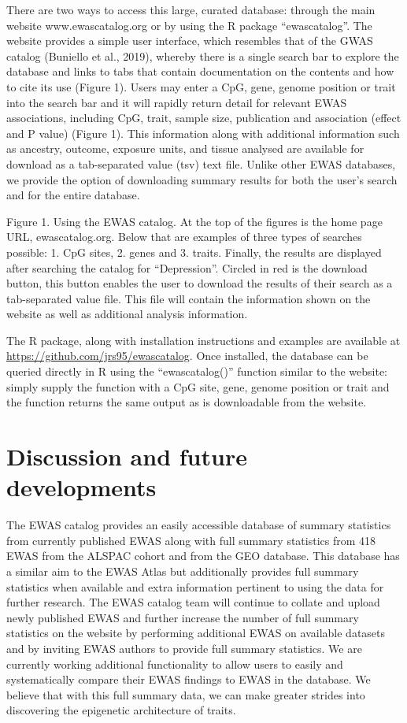 \documentclass[11pt,twoside]{bristolthesis}
\begin{document}
There are two ways to access this large, curated database: through the main website www.ewascatalog.org or by using the R package ``ewascatalog''. The website provides a simple user interface, which resembles that of the GWAS catalog (Buniello et al., 2019), whereby there is a single search bar to explore the database and links to tabs that contain documentation on the contents and how to cite its use (Figure 1). Users may enter a CpG, gene, genome position or trait into the search bar and it will rapidly return detail for relevant EWAS associations, including CpG, trait, sample size, publication and association (effect and P value) (Figure 1). This information along with additional information such as ancestry, outcome, exposure units, and tissue analysed are available for download as a tab-separated value (tsv) text file. Unlike other EWAS databases, we provide the option of downloading summary results for both the user's search and for the entire database.

Figure 1. Using the EWAS catalog. At the top of the figures is the home page URL, ewascatalog.org. Below that are examples of three types of searches possible: 1. CpG sites, 2. genes and 3. traits. Finally, the results are displayed after searching the catalog for ``Depression''. Circled in red is the download button, this button enables the user to download the results of their search as a tab-separated value file. This file will contain the information shown on the website as well as additional analysis information.

The R package, along with installation instructions and examples are available at \url{https://github.com/jrs95/ewascatalog}. Once installed, the database can be queried directly in R using the ``ewascatalog()'' function similar to the website: simply supply the function with a CpG site, gene, genome position or trait and the function returns the same output as is downloadable from the website.

\hypertarget{discussion-and-future-developments}{%
\section{Discussion and future developments}\label{discussion-and-future-developments}}

The EWAS catalog provides an easily accessible database of summary statistics from currently published EWAS along with full summary statistics from 418 EWAS from the ALSPAC cohort and from the GEO database. This database has a similar aim to the EWAS Atlas but additionally provides full summary statistics when available and extra information pertinent to using the data for further research. The EWAS catalog team will continue to collate and upload newly published EWAS and further increase the number of full summary statistics on the website by performing additional EWAS on available datasets and by inviting EWAS authors to provide full summary statistics. We are currently working additional functionality to allow users to easily and systematically compare their EWAS findings to EWAS in the database. We believe that with this full summary data, we can make greater strides into discovering the epigenetic architecture of traits.
\end{document}
